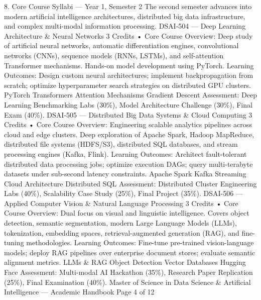 8. Core Course Syllabi — Year 1, Semester 2
The second semester advances into modern artificial intelligence architectures, distributed big data infrastructure,
and complex multi-modal information processing.
DSAI-504 — Deep Learning Architecture \& Neural Networks
3 Credits • Core
Course Overview: Deep study of artificial neural networks, automatic differentiation engines, convolutional
networks (CNNs), sequence models (RNNs, LSTMs), and self-attention Transformer mechanisms. Hands-on
model development using PyTorch.
Learning Outcomes: Design custom neural architectures; implement backpropagation from scratch; optimize
hyperparameter search strategies on distributed GPU clusters.
PyTorch Transformers Attention Mechanisms Gradient Descent
Assessment: Deep Learning Benchmarking Labs (30\%), Model Architecture Challenge (30\%), Final Exam (40\%).
DSAI-505 — Distributed Big Data Systems \& Cloud Computing
3 Credits • Core
Course Overview: Engineering scalable analytics pipelines across cloud and edge clusters. Deep exploration of
Apache Spark, Hadoop MapReduce, distributed file systems (HDFS/S3), distributed SQL databases, and stream
processing engines (Kafka, Flink).
Learning Outcomes: Architect fault-tolerant distributed data processing jobs; optimize execution DAGs; query
multi-terabyte datasets under sub-second latency constraints.
Apache Spark Kafka Streaming Cloud Architecture Distributed SQL
Assessment: Distributed Cluster Engineering Labs (40\%), Scalability Case Study (25\%), Final Project (35\%).
DSAI-506 — Applied Computer Vision \& Natural Language Processing
3 Credits • Core
Course Overview: Dual focus on visual and linguistic intelligence. Covers object detection, semantic
segmentation, modern Large Language Models (LLMs), tokenization, embedding spaces, retrieval-augmented
generation (RAG), and fine-tuning methodologies.
Learning Outcomes: Fine-tune pre-trained vision-language models; deploy RAG pipelines over enterprise
document stores; evaluate semantic alignment metrics.
LLMs \& RAG Object Detection Vector Databases Hugging Face
Assessment: Multi-modal AI Hackathon (35\%), Research Paper Replication (25\%), Final Examination (40\%).
Master of Science in Data Science \& Artificial Intelligence — Academic Handbook
Page 4 of 12

